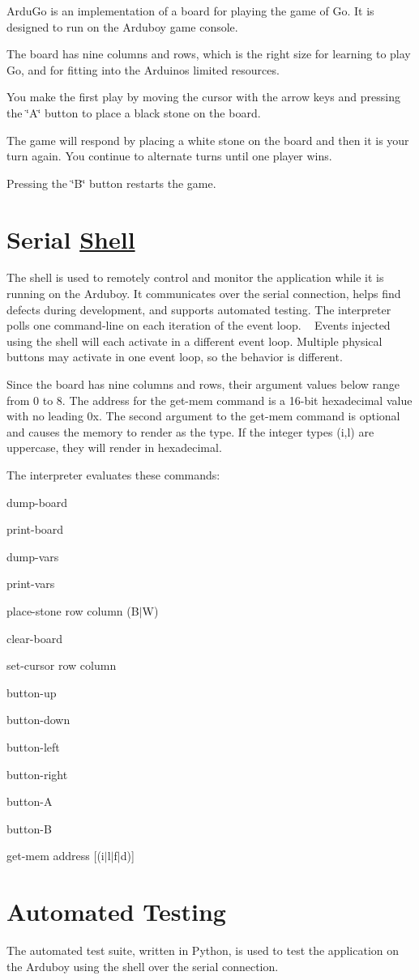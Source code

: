 Ardu\+Go is an implementation of a board for playing the game of Go. It is designed to run on the Arduboy game console.

The board has nine columns and rows, which is the right size for learning to play Go, and for fitting into the Arduino\textquotesingle{}s limited resources.

You make the first play by moving the cursor with the arrow keys and pressing the \char`\"{}\+A\char`\"{} button to place a black stone on the board.

The game will respond by placing a white stone on the board and then it is your turn again. You continue to alternate turns until one player wins.

Pressing the \char`\"{}\+B\char`\"{} button restarts the game.

\section*{Serial \mbox{\hyperlink{struct_shell}{Shell}}}

The shell is used to remotely control and monitor the application while it is running on the Arduboy. It communicates over the serial connection, helps find defects during development, and supports automated testing. The interpreter polls one command-\/line on each iteration of the event loop. ~\newline
 Events injected using the shell will each activate in a different event loop. Multiple physical buttons may activate in one event loop, so the behavior is different.

Since the board has nine columns and rows, their argument values below range from 0 to 8. The address for the get-\/mem command is a 16-\/bit hexadecimal value with no leading \textquotesingle{}0x\textquotesingle{}. The second argument to the get-\/mem command is optional and causes the memory to render as the type. If the integer types (i,l) are uppercase, they will render in hexadecimal.

The interpreter evaluates these commands\+:


\begin{DoxyItemize}
\item dump-\/board
\item print-\/board
\item dump-\/vars
\item print-\/vars
\item place-\/stone row column (B$\vert$W)
\item clear-\/board
\item set-\/cursor row column
\item button-\/up
\item button-\/down
\item button-\/left
\item button-\/right
\item button-\/A
\item button-\/B
\item get-\/mem address \mbox{[}(i$\vert$l$\vert$f$\vert$d)\mbox{]}
\end{DoxyItemize}

\section*{Automated Testing}

The automated test suite, written in Python, is used to test the application on the Arduboy using the shell over the serial connection.

 